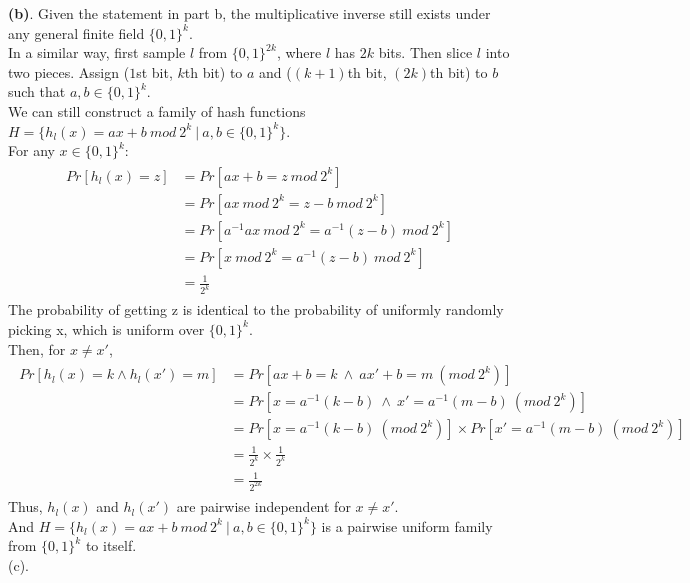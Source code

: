 \documentclass[titlepage, paper=a4, fontsize=11pt]{scrartcl} %
\numberwithin{equation}{section} %
\numberwithin{figure}{section} %
\numberwithin{table}{section} %
\begin{document}
\textbf{(b)}. Given the statement in part b, the multiplicative inverse still exists under any general finite field $\{0,1\}^k$. \\
In a similar way, first sample $l$ from $\{0,1\}^{2k}$, where $l$ has $2k$ bits. Then slice $l$ into two pieces.
Assign ($1$st bit, $k$th bit) to $a$ and ($(k+1)$th bit, $(2k)$th bit) to $b$ such that $a,b \in \{0,1\}^k$. \\
We can still construct a family of hash functions $H=\{ h_l(x)=ax+b \ mod \ 2^k\ |\ a,b \in \{0,1\}^k \}$. \\
For any $x \in \{0,1\}^k$:
\begin{align*} 
\begin{split}
Pr[h_l(x) = z] &= Pr[ax+b = z \ mod \ 2^k] \\
&= Pr[ax \ mod \ 2^k = z-b \ mod \ 2^k] \\
&= Pr[a^{-1}ax \ mod \ 2^k = a^{-1}(z-b) \ mod \ 2^k] \\
&= Pr[x \ mod \ 2^k = a^{-1}(z-b) \ mod \ 2^k] \\
&= \frac{1}{2^k}
\end{split}					
\end{align*}
The probability of getting z is identical to the probability of uniformly randomly picking x, which is uniform over
$\{0,1\}^k$. \\
Then, for $x \neq x'$,
\begin{align*} 
\begin{split}
Pr[h_l(x) = k \land h_l(x') = m] &= Pr[ax+b=k \ \land \ ax'+b=m \  (mod\ 2^k)] \\
&= Pr[x=a^{-1}(k-b) \ \land \ x'=a^{-1}(m-b) \  (mod\ 2^k)] \\
&= Pr[x=a^{-1}(k-b) \  (mod\ 2^k)] \times Pr[x'=a^{-1}(m-b) \ (mod\ 2^k)] \\
&= \frac{1}{2^k} \times \frac{1}{2^k} \\
&= \frac{1}{2^{2k}}
\end{split}					
\end{align*}
Thus, $h_l(x)$ and $h_l(x')$ are pairwise independent for $x \neq x'$. \\
And $H=\{ h_l(x)=ax+b \ mod\ 2^k\ |\ a,b \in \{0,1\}^k \}$ is a pairwise uniform family from $\{0,1\}^k$ to itself. \\

(c).
\\


\end{document}
